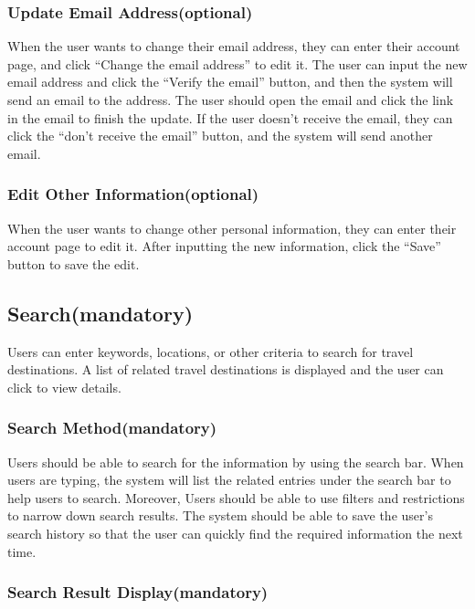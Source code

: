 \documentclass[conference]{IEEEtran}
\begin{document}
\subsubsection{ Update Email Address(optional) }

When the user wants to change their email address, they can enter their 
account page, and click “Change the email address” to edit it. The user can 
input the new email address and click the “Verify the email” button, and then the 
system will send an email to the address. The user should open the email and 
click the link in the email to finish the update. If the user doesn't receive the 
email, they can click the “don’t receive the email” button, and the system will 
send another email.

\subsubsection{ Edit Other Information(optional) }

When the user wants to change other personal information, they can 
enter their account page to edit it. After inputting the new information, click 
the “Save” button to save the edit.

\subsection{ Search(mandatory) }

Users can enter keywords, locations, or other criteria to search for travel 
destinations.
A list of related travel destinations is displayed and the user can click to view 
details.

\subsubsection{ Search Method(mandatory) }

Users should be able to search for the information by using the search 
bar. When users are typing, the system will list the related entries under the 
search bar to help users to search. Moreover, Users should be able to use 
filters and restrictions to narrow down search results. The system should be 
able to save the user's search history so that the user can quickly find the 
required information the next time.

\subsubsection{ Search Result Display(mandatory) }
\end{document}
